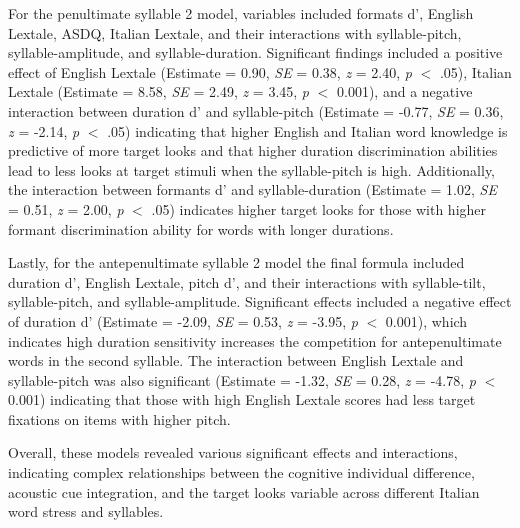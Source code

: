 For the penultimate syllable 2 model, variables included formats d', English Lextale, ASDQ, Italian Lextale, and their interactions with syllable-pitch, syllable-amplitude, and syllable-duration. Significant findings included a positive effect of English Lextale (Estimate = 0.90, \textit{SE} = 0.38, \textit{z} = 2.40, \textit{p} $<$ .05), Italian Lextale (Estimate = 8.58, \textit{SE} = 2.49, \textit{z} = 3.45, \textit{p} $<$ 0.001), and a negative interaction between duration d' and syllable-pitch (Estimate = -0.77, \textit{SE} = 0.36, \textit{z} = -2.14, \textit{p} $<$ .05) indicating that higher English and Italian word knowledge is predictive of more target looks and that higher duration discrimination abilities lead to less looks at target stimuli when the syllable-pitch is high. Additionally, the interaction between formants d' and syllable-duration (Estimate = 1.02, \textit{SE} = 0.51, \textit{z} = 2.00, \textit{p} $<$ .05) indicates higher target looks for those with higher formant discrimination ability for words with longer durations.

Lastly, for the antepenultimate syllable 2 model the final formula included duration d', English Lextale, pitch d', and their interactions with syllable-tilt, syllable-pitch, and syllable-amplitude. Significant effects included a negative effect of duration d' (Estimate = -2.09, \textit{SE} = 0.53, \textit{z} = -3.95, \textit{p} $<$ 0.001), which indicates high duration sensitivity increases the competition for antepenultimate words in the second syllable. The interaction between English Lextale and syllable-pitch was also significant (Estimate = -1.32, \textit{SE} = 0.28, \textit{z} = -4.78, \textit{p} $<$ 0.001) indicating that those with high English Lextale scores had less target fixations on items with higher pitch.

Overall, these models revealed various significant effects and interactions, indicating complex relationships between the cognitive individual difference, acoustic cue integration, and the target looks variable across different Italian word stress and syllables.


